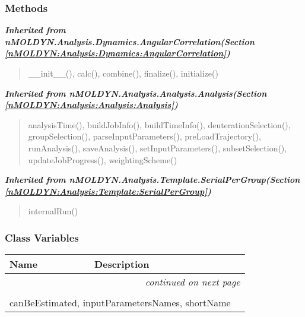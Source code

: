 
  \subsubsection{Methods}


\large{\textbf{\textit{Inherited from nMOLDYN.Analysis.Dynamics.AngularCorrelation\textit{(Section \ref{nMOLDYN:Analysis:Dynamics:AngularCorrelation})}}}}

\begin{quote}
\_\_init\_\_(), calc(), combine(), finalize(), initialize()
\end{quote}

\large{\textbf{\textit{Inherited from nMOLDYN.Analysis.Analysis.Analysis\textit{(Section \ref{nMOLDYN:Analysis:Analysis:Analysis})}}}}

\begin{quote}
analysisTime(), buildJobInfo(), buildTimeInfo(), deuterationSelection(), groupSelection(), parseInputParameters(), preLoadTrajectory(), runAnalysis(), saveAnalysis(), setInputParameters(), subsetSelection(), updateJobProgress(), weightingScheme()
\end{quote}

\large{\textbf{\textit{Inherited from nMOLDYN.Analysis.Template.SerialPerGroup\textit{(Section \ref{nMOLDYN:Analysis:Template:SerialPerGroup})}}}}

\begin{quote}
internalRun()
\end{quote}


  \subsubsection{Class Variables}

    \vspace{-1cm}
\hspace{\varindent}\begin{longtable}{|p{\varnamewidth}|p{\vardescrwidth}|l}
\cline{1-2}
\cline{1-2} \centering \textbf{Name} & \centering \textbf{Description}& \\
\cline{1-2}
\endhead\cline{1-2}\multicolumn{3}{r}{\small\textit{continued on next page}}\\\endfoot\cline{1-2}
\endlastfoot\multicolumn{2}{|l|}{\textit{Inherited from nMOLDYN.Analysis.Dynamics.AngularCorrelation \textit{(Section \ref{nMOLDYN:Analysis:Dynamics:AngularCorrelation})}}}\\
\multicolumn{2}{|p{\varwidth}|}{\raggedright canBeEstimated, inputParametersNames, shortName}\\
\cline{1-2}
\end{longtable}

